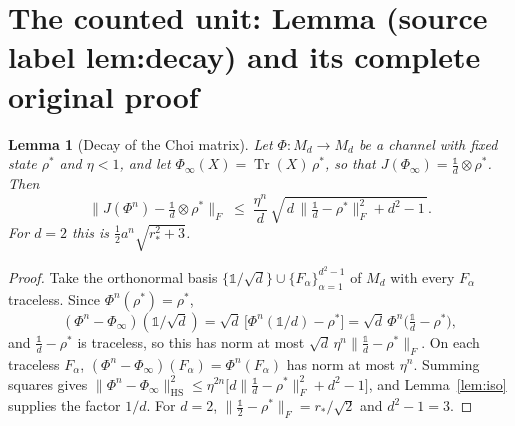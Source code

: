 \documentclass[10pt,a4paper]{amsart}
\newcommand{\openone}{\mathbb{1}}%
\theoremstyle{plain}
\newtheorem{lemma}[theorem]{Lemma}
\theoremstyle{definition}
\theoremstyle{remark}
\begin{document}
\section{The counted unit: Lemma (source label lem:decay) and its complete original proof}

\begin{lemma}[Decay of the Choi matrix]\label{lem:decay}
Let $\Phi:M_d\to M_d$ be a channel with fixed state $\rho^\ast$ and $\eta<1$,
and let $\Phi_\infty(X)=\operatorname{Tr}(X)\,\rho^\ast$, so that
$J(\Phi_\infty)=\tfrac{\openone}{d}\otimes\rho^\ast$. Then
\begin{equation}\label{eq:decay}
  \bigl\|J(\Phi^n)-\tfrac{\openone}{d}\otimes\rho^\ast\bigr\|_F
  \;\le\; \frac{\eta^{n}}{d}\,
  \sqrt{\,d\,\bigl\|\tfrac{\openone}{d}-\rho^\ast\bigr\|_F^{2}+d^{2}-1\,}.
\end{equation}
For $d=2$ this is $\tfrac12 a^{n}\sqrt{r_\ast^{2}+3}$.
\end{lemma}

\begin{proof}
Take the orthonormal basis $\{\openone/\sqrt d\}\cup\{F_\alpha\}_{\alpha=1}^{d^2-1}$
of $M_d$ with every $F_\alpha$ traceless. Since $\Phi^n(\rho^\ast)=\rho^\ast$,
\begin{equation}
 (\Phi^n-\Phi_\infty)(\openone/\sqrt d)=\sqrt d\,\bigl[\Phi^n(\openone/d)-\rho^\ast\bigr]
 =\sqrt d\,\Phi^n\!\bigl(\tfrac{\openone}{d}-\rho^\ast\bigr),
\end{equation}
and $\tfrac{\openone}{d}-\rho^\ast$ is traceless, so this has norm at most
$\sqrt d\,\eta^{n}\|\tfrac{\openone}{d}-\rho^\ast\|_F$. On each traceless
$F_\alpha$, $(\Phi^n-\Phi_\infty)(F_\alpha)=\Phi^n(F_\alpha)$ has norm at most
$\eta^n$. Summing squares gives
$\|\Phi^n-\Phi_\infty\|_{\mathrm{HS}}^2\le\eta^{2n}\bigl[d\|\tfrac{\openone}{d}-\rho^\ast\|_F^2+d^2-1\bigr]$,
and Lemma~\ref{lem:iso} supplies the factor $1/d$. For $d=2$,
$\|\tfrac{\openone}{2}-\rho^\ast\|_F=r_\ast/\sqrt2$ and $d^2-1=3$.
\end{proof}
\end{document}
